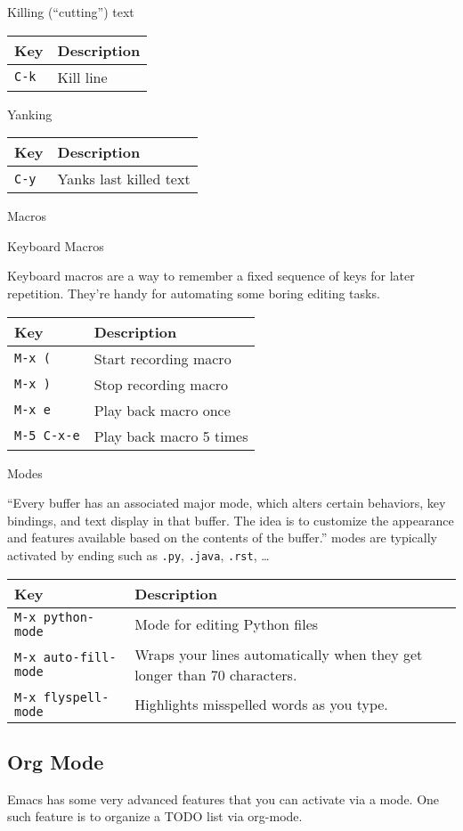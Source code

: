 Killing (``cutting'') text

\begin{longtable}[]{ll}
\toprule
Key & Description\tabularnewline
\midrule
\endhead
\verb|C-k| & Kill line\tabularnewline
\bottomrule
\end{longtable}

Yanking

\begin{longtable}[]{ll}
\toprule
Key & Description\tabularnewline
\midrule
\endhead
\verb|C-y| & Yanks last killed text\tabularnewline
\bottomrule
\end{longtable}

Macros

Keyboard Macros

Keyboard macros are a way to remember a fixed sequence of keys for later
repetition. They're handy for automating some boring editing tasks.

\begin{longtable}[]{ll}
\toprule
Key & Description\tabularnewline
\midrule
\endhead
\verb|M-x (| & Start recording macro\tabularnewline
\verb|M-x )| & Stop recording macro\tabularnewline
\verb|M-x e| & Play back macro once\tabularnewline
\verb|M-5 C-x-e| & Play back macro 5 times\tabularnewline
\bottomrule
\end{longtable}

Modes

``Every buffer has an associated major mode, which alters certain
behaviors, key bindings, and text display in that buffer. The idea is to
customize the appearance and features available based on the contents of
the buffer.'' modes are typically activated by ending such as \verb|.py|,
\verb|.java|, \verb|.rst|, \ldots{}

\begin{longtable}[]{ll}
\toprule
Key & Description\tabularnewline
\midrule
\endhead
\verb|M-x python-mode| & Mode for editing Python files\tabularnewline
\verb|M-x auto-fill-mode| & Wraps your lines automatically when they get longer
than 70 characters.\tabularnewline
\verb|M-x flyspell-mode| & Highlights misspelled words as you type.\tabularnewline
\bottomrule
\end{longtable}


\subsection{Org Mode}

Emacs has some very advanced features that you can activate via a
mode. One such feature is to organize a TODO list via org-mode.

